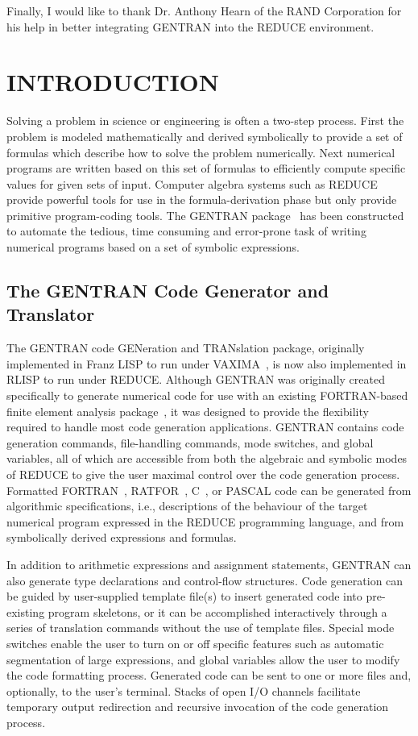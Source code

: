 Finally, I would like to thank Dr. Anthony Hearn of the RAND
Corporation for his help in better integrating GENTRAN into the REDUCE
environment.

\section{INTRODUCTION}

Solving a problem in science or engineering is often a two-step
process.  First the problem is modeled mathematically and derived
symbolically to provide a set of formulas which describe how to solve
the problem numerically.  Next numerical programs are written based on
this set of formulas to efficiently compute specific values for given
sets of input.  Computer algebra systems such as REDUCE
provide powerful tools for use in the formula-derivation phase but
only provide primitive program-coding tools.  The GENTRAN
package~\cite{Gates:85,Gates:85a,Gates:85b,Gates:86}
has been constructed to automate the tedious,
time consuming and error-prone task of writing numerical programs
based on a set of symbolic expressions.

\subsection{The GENTRAN Code Generator and Translator}
The GENTRAN code GENeration and TRANslation package, originally
implemented in Franz LISP to run under VAXIMA~\cite{Gates:84}, is now also
implemented in RLISP to run under REDUCE.  Although GENTRAN
was originally created specifically to generate numerical
code for use with an existing FORTRAN-based finite element analysis
package~\cite{Wang:86,Wang:84}, it was designed
to provide the flexibility required to handle most code generation
applications.  GENTRAN contains code generation commands, file-handling
commands, mode switches, and global variables, all of which are
accessible from both the algebraic and symbolic modes of REDUCE to
give the user maximal control over the code generation process.  Formatted
  
FORTRAN~\cite{FORTRAN}, RATFOR~\cite{Kernighan:79}, C~\cite{Kernighan:78},
or PASCAL code can be generated from algorithmic specifications,
i.e., descriptions of the behaviour of the target numerical program expressed
in the REDUCE programming language, and from symbolically derived expressions
and formulas.

In addition to arithmetic expressions and assignment statements,
GENTRAN can also generate type declarations and control-flow
structures.  Code generation can be guided by user-supplied
template file(s) to insert generated code into pre-existing program
skeletons, or it can be accomplished interactively through a series
of translation commands without the use of template files.  Special
mode switches enable the user to turn on or off specific features such as
automatic segmentation of large expressions, and global variables
allow the user to modify the code formatting process.  Generated
code can be sent to one or more files and, optionally, to
the user's terminal.  Stacks of open I/O channels facilitate temporary
output redirection and recursive invocation of the code generation process.

